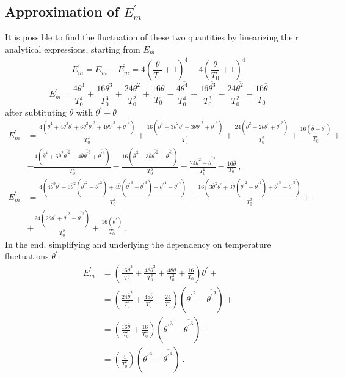 \documentclass[10pt]{article}
\def\lp{\left(}
\def\rp{\right)}
\def\tp{\overline{{\theta^\prime}^2}}
\def\tm{\overline{\theta}}
\def\tr{{\theta^\prime}}
\begin{document}
\subsection*{Approximation of $E_m^\prime$}
It is possible to find the fluctuation of these two quantities by linearizing their analytical expressions, starting from $E_m$
\begin{equation*}
E_m^\prime  = E_m - \overline{E_m} = 4 {\lp \frac{\theta}{T_0} + 1\rp }^4 - 4\overline{ {\lp \frac{\theta}{T_0} + 1\rp }^4}
\end{equation*}
\begin{equation*}
E_m^\prime  = \frac{4 \theta^4}{T_0^4} + \frac{16 \theta^3}{T_0^3} + \frac{24 \theta^2}{T_0^2} + \frac{16\theta}{T_0}  
            - \frac{4 \overline{\theta^4}}{T_0^4} - \frac{16 \overline{\theta^3}}{T_0^3} - \frac{24 \overline{\theta^2}}{T_0^2} - \frac{16\tm}{T_0}  
\end{equation*}
after subtituting $\theta$ with $\tr+\tm$
\begin{equation*}
\begin{split}
E_m^\prime & = \frac{4 (\tm^4 + 4\tm^3 \tr + 6\tm^2 \tr^2+4\tm\tr^3+\tr^4)}{T_0^4} + \frac{16 (\tm^3 + 3\tm^2\tr+3\tm\tr^2+\tr^3)}{T_0^3} + \frac{24 (\tm^2+2\tm\tr+\tr^2)}{T_0^2} + \frac{16(\tm+\tr)}{T_0} + \\
           & - \frac{4 (\tm^4 + 6\tm^2 \tp +4\tm\overline{\tr^3} + \overline{\tr^4})}{T_0^4} - \frac{16(\tm^3 +3\tm\tp+\overline{\tr^3})}{T_0^3} - \frac{24 \tm^2 + \tp}{T_0^2} - \frac{16\tm}{T_0}  \ ,
\end{split}
\end{equation*}
\begin{equation*}
\begin{split}
E_m^\prime & = \frac{4 (4\tm^3 \tr + 6\tm^2 (\tr^2-\tp)+4\tm(\tr^3-\overline{\tr^3})+\tr^4-\overline{\tr^4})}{T_0^4} + \frac{16 (3\tm^2\tr+3\tm(\tr^2-\tp)+\tr^3-\overline{\tr^3})}{T_0^3} + \\
           & + \frac{24 (2\tm\tr+\tr^2-\tp)}{T_0^2} + \frac{16(\tr)}{T_0}  \ .
\end{split}
\end{equation*}
In the end, simplifying and underlying the dependency on temperature fluctuations $\tr$:
\begin{equation*}
\begin{split}
E_m^\prime & = \lp \frac{16 \tm^3}{T_0^4} + \frac{48 \tm^2}{T_0^3} + \frac{48 \tm}{T_0^2} + \frac{16}{T_0}  \rp \tr + \\
           & = \lp \frac{24 \tm^2}{T_0^4} + \frac{48 \tm}{T_0^3}   + \frac{24}{T_0^2}   \rp (\tr^2 - \tp) + \\
           & = \lp \frac{16 \tm}{T_0^4}   + \frac{16} {T_0^3}   \rp (\tr^3 - \overline{\tr^3}) + \\
           & = \lp \frac{4}{T_0^4}  \rp (\tr^4 - \overline{\tr^4})  \ .
\end{split}
\end{equation*}
\end{document}
